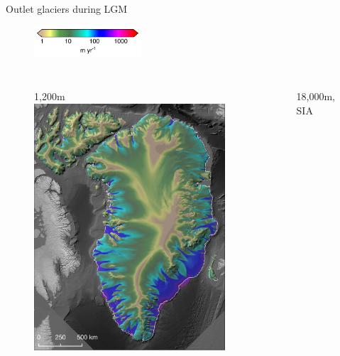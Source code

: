 \documentclass[hide notes,intlimits]{beamer}
\begin{document}
\begin{frame}{Outlet glaciers during LGM}
  \begin{figure}  
    \includegraphics[width=4cm]{colorbar-speed}
  \end{figure}
  \begin{columns}
    \column[T]{5cm}
    \vspace{-2em}
    \begin{figure}
      {\scriptsize{1,200m}\\}
      \includegraphics[height=0.7\textheight]{lgm_cc_speed_1200m_ws}
    \end{figure}
    \column[T]{5cm}
    \vspace{-2em}
    \begin{figure}
      {\scriptsize{18,000m, SIA}\\}

\end{figure}
\end{columns}
\end{frame}
\end{document}
